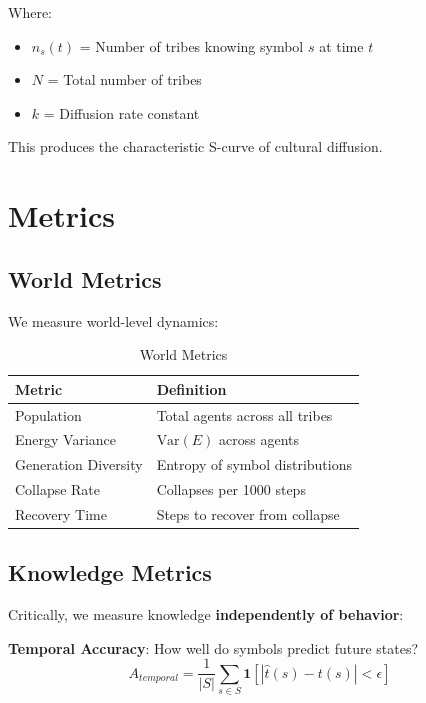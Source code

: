 \documentclass[11pt,a4paper]{article}
\begin{document}
Where:
\begin{itemize}
    \item $n_s(t)$ = Number of tribes knowing symbol $s$ at time $t$
    \item $N$ = Total number of tribes
    \item $k$ = Diffusion rate constant
\end{itemize}

This produces the characteristic S-curve of cultural diffusion.

\section{Metrics}

\subsection{World Metrics}

We measure world-level dynamics:

\begin{table}[htbp]
\centering
\caption{World Metrics}
\label{tab:world_metrics}
\begin{tabular}{@{}ll@{}}
\toprule
\textbf{Metric} & \textbf{Definition} \\
\midrule
Population & Total agents across all tribes \\
Energy Variance & $\text{Var}(E)$ across agents \\
Generation Diversity & Entropy of symbol distributions \\
Collapse Rate & Collapses per 1000 steps \\
Recovery Time & Steps to recover from collapse \\
\bottomrule
\end{tabular}
\end{table}

\subsection{Knowledge Metrics}

Critically, we measure knowledge \textbf{independently of behavior}:

\textbf{Temporal Accuracy}: How well do symbols predict future states?
\begin{equation}
A_{temporal} = \frac{1}{|S|} \sum_{s \in S} \mathbf{1}[|\hat{t}(s) - t(s)| < \epsilon]
\end{equation}
\end{document}
